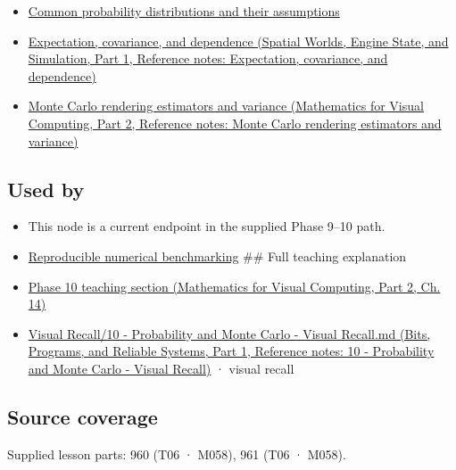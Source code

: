 \begin{itemize}
\tightlist
\item
  \hyperref[appendix-a2360b435383]{Common probability distributions and their assumptions}
\item
  \href{../05-Spatial-Worlds-Engine-State-and-Simulation-P01/main.pdf\#appendix-54c383df9992}{Expectation, covariance, and dependence (Spatial Worlds, Engine State, and Simulation, Part 1, Reference notes: Expectation, covariance, and dependence)}
\item
  \href{../02-Mathematics-for-Visual-Computing-P02/main.pdf\#appendix-031e02bf28af}{Monte Carlo rendering estimators and variance (Mathematics for Visual Computing, Part 2, Reference notes: Monte Carlo rendering estimators and variance)}
\end{itemize}

\subsection{Used by}\label{appendix-c83016554b1e-used-by}

\hypertarget{appendix-c83016554b1e-used-by}{}

\begin{itemize}
\item
  This node is a current endpoint in the supplied Phase 9--10 path.
\item
  \hyperref[appendix-b9db93e28371]{Reproducible numerical benchmarking} \#\# Full teaching explanation
\item
  \href{../02-Mathematics-for-Visual-Computing-P02/main.pdf\#02-foundations-ii-ch030-inference-and-error-metrics-need-explicit-assumptions}{Phase 10 teaching section (Mathematics for Visual Computing, Part 2, Ch. 14)}
\item
  \href{../01-Bits-Programs-and-Reliable-Systems-P01/main.pdf\#appendix-cb5af353ef77}{Visual Recall/10 - Probability and Monte Carlo - Visual Recall.md (Bits, Programs, and Reliable Systems, Part 1, Reference notes: 10 - Probability and Monte Carlo - Visual Recall)} · visual recall
\end{itemize}

\subsection{Source coverage}\label{appendix-c83016554b1e-source-coverage}

\hypertarget{appendix-c83016554b1e-source-coverage}{}

Supplied lesson parts: 960 (T06 · M058), 961 (T06 · M058).

